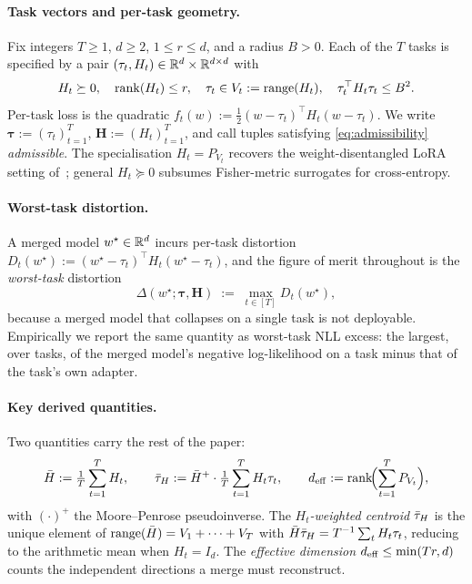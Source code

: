 \paragraph{Task vectors and per-task geometry.} Fix integers $T \geq 1$,
$d \geq 2$, $1 \leq r \leq d$, and a radius $B > 0$. Each of the $T$
tasks is specified by a pair $(\tau_t, H_t) \in \mathbb{R}^d \times \mathbb{R}^{d\times d}$
with
\begin{equation}\label{eq:admissibility}
  H_t \succeq 0,\quad \operatorname{rank}(H_t) \leq r,\quad \tau_t \in V_t :=
  \operatorname{range}(H_t),\quad \tau_t^\top H_t \tau_t \leq B^2.
\end{equation}
Per-task loss is the quadratic $f_t(w) := \tfrac12 (w - \tau_t)^\top
H_t (w - \tau_t)$. We write $\boldsymbol\tau := (\tau_t)_{t=1}^T$,
$\boldsymbol H := (H_t)_{t=1}^T$, and call tuples satisfying
\eqref{eq:admissibility} \emph{admissible}. The specialisation
$H_t = P_{V_t}$ recovers the weight-disentangled LoRA setting
of~\citet{ortizjimenez2023disentanglement}; general $H_t \succeq 0$
subsumes Fisher-metric surrogates for cross-entropy.

\paragraph{Worst-task distortion.} A merged model $w^\star \in \mathbb{R}^d$
incurs per-task distortion $D_t(w^\star) := (w^\star - \tau_t)^\top H_t
(w^\star - \tau_t)$, and the figure of merit throughout is the
\emph{worst-task} distortion
\begin{equation}\label{eq:worst-task}
  \Delta(w^\star; \boldsymbol\tau, \boldsymbol H)
  \;:=\; \max_{t\in[T]} D_t(w^\star),
\end{equation}
because a merged model that collapses on a single task is not deployable.
Empirically we report the same quantity as worst-task NLL excess: the largest,
over tasks, of the merged model's negative log-likelihood on a task minus that
of the task's own adapter.

\paragraph{Key derived quantities.} Two quantities carry the rest of the
paper:
\begin{equation}\label{eq:derived}
  \bar H := \tfrac1T\sum_{t=1}^T H_t,\qquad
  \bar{\tau}_H := \bar H^+\cdot \tfrac1T\sum_{t=1}^T H_t\tau_t,\qquad
  d_{\mathrm{eff}} := \operatorname{rank}\!\Bigl(\sum_{t=1}^T P_{V_t}\Bigr),
\end{equation}
with $(\cdot)^+$ the Moore--Penrose pseudoinverse. The \emph{$H_t$-weighted
centroid} $\bar{\tau}_H$ is the unique element of $\operatorname{range}(\bar H) = V_1 + \cdots +
V_T$ with $\bar H \bar{\tau}_H = T^{-1}\sum_t H_t \tau_t$, reducing to the arithmetic
mean when $H_t = I_d$. The \emph{effective dimension} $d_{\mathrm{eff}} \leq \min(Tr, d)$
counts the independent directions a merge must reconstruct.

